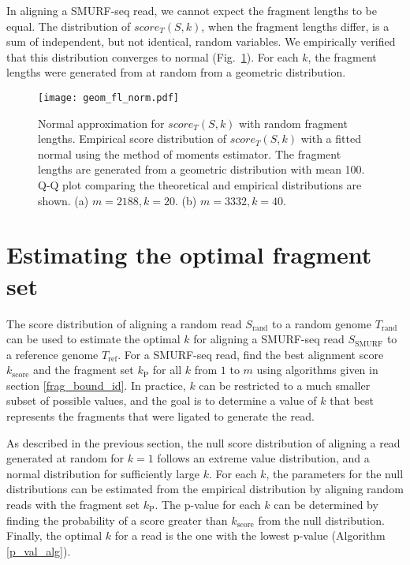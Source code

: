 In aligning a SMURF-seq read, we cannot expect the fragment lengths to
be equal. The distribution of $score_T(S,k)$, when the fragment lengths
differ, is a sum of independent, but not identical, random variables. We
empirically verified that this distribution converges to normal
(Fig.~\ref{norm_geom}). For each $k$, the fragment lengths were
generated from at random from a geometric distribution.

\begin{figure}[t!]
\centering
\texttt{[image: geom\_fl\_norm.pdf]}
\caption[Normal approximation for $score_T(S,k)$ with random fragment
  lengths]{
  Normal approximation for $score_T(S,k)$ with random fragment lengths.
  Empirical score distribution of $score_T(S,k)$ with a fitted
  normal using the method of moments estimator. The fragment lengths are
  generated from a geometric distribution with mean 100. Q-Q plot comparing
  the theoretical and empirical distributions are shown.
  (a) $m=2188, k=20$.
  (b) $m=3332, k=40$.}
\label{norm_geom}
\end{figure}


\section{Estimating the optimal fragment set}
The score distribution of aligning a random read $S_\mathrm{rand}$ to a
random genome $T_\mathrm{rand}$ can be used to estimate the optimal $k$
for aligning a SMURF-seq read $S_\mathrm{SMURF}$ to a reference genome
$T_\mathrm{ref}$.
For a SMURF-seq read, find the best alignment score $k_\mathrm{score}$
and the fragment set $k_\mathrm{P}$ for all $k$ from $1$ to $m$ using
algorithms given in section \ref{frag_bound_id}. In practice, $k$ can be
restricted to a much smaller subset of possible values, and the goal is
to determine a value of $k$ that best represents the fragments that were
ligated to generate the read.
%

As described in the previous section, the null score distribution of
aligning a read generated at random for $k=1$ follows an extreme value
distribution, and a normal distribution for sufficiently large $k$.  For
each $k$, the parameters for the null distributions can be estimated
from the empirical distribution by aligning random reads with the
fragment set $k_\mathrm{P}$.
%
The p-value for each $k$ can be determined by finding the probability of
a score greater than $k_\mathrm{score}$ from the null distribution.
Finally, the optimal $k$ for a read is the one with the lowest p-value
(Algorithm \ref{p_val_alg}).


